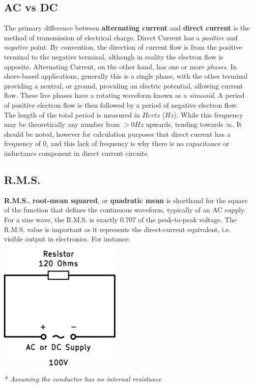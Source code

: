 \documentclass[11pt,a4paper]{article}
\begin{document}
\subsection{AC vs DC}
The primary difference between \textbf{alternating current} and \textbf{direct current} is the method of transmission of electrical charge. Direct Current has a \textit{positive} and \textit{negative} point. By convention, the direction of current flow is from the positive terminal to the negative terminal, although in reality the electron flow is opposite.\cite{e6} Alternating Current, on the other hand, has one or more \textit{phases}. In shore-based applications, generally this is a single phase, with the other terminal providing a neutral, or ground, providing an electric potential, allowing current flow. These live phases have a rotating waveform known as a \textit{sinusoid}. A period of positive electron flow is then followed by a period of negative electron flow. The length of the total period is measured in $Hertz$ ($Hz$). While this frequency may be theoretically any number from $>0 Hz$ upwards, tending towards $\infty$. It should be noted, however for calculation purposes that direct current has a frequency of $0$, and this lack of frequency is why there is no capacitance or inductance component in direct current circuits.
\subsection{R.M.S.}
\textbf{R.M.S.}, \textbf{root-mean squared}, or \textbf{quadratic mean} is shorthand for the square of the function that defines the continuous waveform, typically of an AC supply. For a sine wave, the R.M.S. is exactly 0.707 of the peak-to-peak voltage. The R.M.S. value is important as it represents the direct-current equivalent, i.e. visible output in electronics. For instance:

\begin{center}
\includegraphics[width=6cm]{RMS.png}\par
\textit{* Assuming the conductor has no internal resistance}
\end{center}
\end{document}
